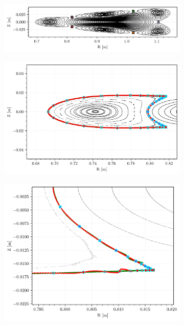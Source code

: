 \begin{figure}[H]
    \centering
    \begin{subfigure}[t]{\textwidth}
        \centering
        \includegraphics[width=\textwidth]{images/quasrs/poincare_1329594.png}
        \caption{}
        \label{fig:p-1329594}
    \end{subfigure}
    \begin{subfigure}[c]{0.54\textwidth}
        \centering
        \includegraphics[width=\textwidth]{images/quasrs/homoclinics_1329594.png}
        \caption{}
        \label{fig:manifold-1329594}
    \end{subfigure}
    \hfill
    \begin{subfigure}[c]{0.44\textwidth}
        \centering
        \includegraphics[width=\textwidth]{images/quasrs/homoclinics_1329594_cu.png}

\end{subfigure}
\end{figure}
